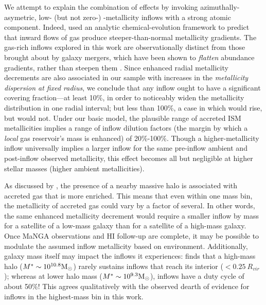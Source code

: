 We attempt to explain the combination of effects by invoking azimuthally-asymetric, low- (but not zero-) -metallicity inflows with a strong atomic component. Indeed, \citet{pezzulli_fraternali_2015} used an analytic chemical-evolution framework to predict that inward flows of gas produce steeper-than-normal metallicity gradients. The gas-rich inflows explored in this work are observationally distinct from those brought about by galaxy mergers, which have been shown to \emph{flatten} abundance gradients, rather than steepen them \citep{rupke_2010_inflows_metgrad}. Since enhanced radial metallicity decrements are also associated in our sample with increases in the \emph{metallicity dispersion at fixed radius}, we conclude that any inflow ought to have a significant covering fraction---at least 10\%, in order to noticeably widen the metallicity distribution in one radial interval; but less than 100\%, a case in which \metdec would rise, but \metdisp would not. Under our basic model, the plausible range of accreted ISM metallicities implies a range of inflow dilution factors (the margin by which a \emph{local} gas reservoir's mass is enhanced) of 20\%-100\%. Though a higher-metallicity inflow universally implies a larger inflow for the same pre-inflow ambient and post-inflow observed metallicity, this effect becomes all but negligible at higher stellar masses (higher ambient metallicities).

As discussed by \citet{schaefer_19_accretion}, the presence of a nearby massive halo is associated with accreted gas that is more enriched. This means that even within one mass bin, the metallicity of accreted gas could vary by a factor of several. In other words, the same enhanced metallicity decrement would require a smaller inflow by mass for a satellite of a low-mass galaxy than for a satellite of a high-mass galaxy. Once MaNGA observations and HI follow-up are complete, it may be possible to modulate the assumed inflow metallicity based on environment. Additionally, galaxy mass itself may impact the inflows it experiences: \citet{muratov_2017_FIRE_cgm_metals} finds that a high-mass halo ($M^* \sim 10^{10.8} {\rm M_{\odot}}$) rarely sustains inflows that reach its interior ($< 0.25~R_{vir}$); whereas at lower halo mass ($M^* \sim 10^{9.3} {\rm M_{\odot}}$), inflows have a duty cycle of about 50\%! This agrees qualitatively with the observed dearth of evidence for inflows in the highest-mass bin in this work.

